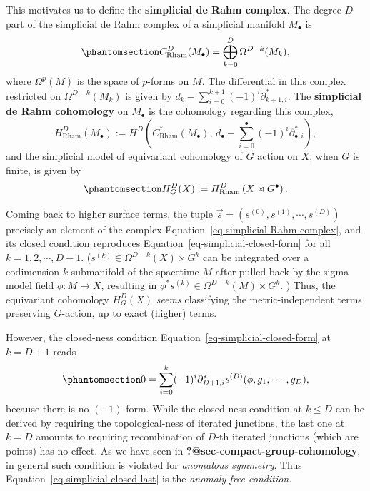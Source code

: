 \documentclass[11pt,toc=bibliography]{scrbook}
\numberwithin{equation}{section}
\begin{document}
This motivates us to define the \textbf{simplicial de Rahm complex}. The
degree \(D\) part of the simplicial de Rahm complex of a simplicial
manifold \(M_\bullet\) is
\begin{equation}\phantomsection\label{eq-simplicial-Rahm-complex}{
C^{D}_\text{Rham}(M_\bullet) = \bigoplus_{k=0}^{D}\Omega^{D-k}(M_k),
}\end{equation} where \(\Omega^p(M)\) is the space of \(p\)-forms on
\(M\). The differential in this complex restricted on
\(\Omega^{D-k}(M_k)\) is given by
\(d_k - \sum_{i=0}^{k+1} (-1)^i \partial_{k+1,i}^*\). The
\textbf{simplicial de Rahm cohomology} on \(M_\bullet\) is the
cohomology regarding this complex, \[
H_\text{Rham}^D(M_\bullet) := H^D\left(C^*_\text{Rham}(M_\bullet) ,\, d_\bullet - \sum_{i=0}^\bullet (-1)^i \partial_{\bullet,i}^*\right),
\] and the simplicial model of equivariant cohomology of \(G\) action on
\(X\), when \(G\) is finite, is given by
\begin{equation}\phantomsection\label{eq-equivariant-borel}{
H_G^D(X) := H_\text{Rham}^D\left(X\rtimes G^\bullet\right).
}\end{equation}

Coming back to higher surface terms, the tuple
\(\vec{s} = (s^{(0)},s^{(1)},\cdots, s^{(D)})\) precisely an element of
the complex Equation~\ref{eq-simplicial-Rahm-complex}, and its closed
condition reproduces Equation~\ref{eq-simplicial-closed-form} for all
\(k=1,2,\cdots, D-1\). (\(s^{(k)} \in \Omega^{D-k}(X)\times G^k\) can be
integrated over a codimension-\(k\) submanifold of the spacetime \(M\)
after pulled back by the sigma model field \(\phi : M \to X\), resulting
in \(\phi^* s^{(k)} \in  \Omega^{D-k}(M)\times G^k\). ) Thus, the
equivariant cohomology \(H_G^D(X)\) \emph{seems} classifying the
metric-independent terms preserving \(G\)-action, up to exact (higher)
terms.

However, the closed-ness condition
Equation~\ref{eq-simplicial-closed-form} at \(k=D+1\) reads
\begin{equation}\phantomsection\label{eq-simplicial-closed-last}{
0 = \sum_{i=0}^{k} (-1)^{i} \partial_{D+1,i}^* s^{(D)}(\phi,g_1,\cdots,g_D),
}\end{equation} because there is no \((-1)\)-form. While the closed-ness
condition at \(k \le D\) can be derived by requiring the
topological-ness of iterated junctions, the last one at \(k=D\) amounts
to requiring recombination of \(D\)-th iterated junctions (which are
points) has no effect. As we have seen in
\textbf{?@sec-compact-group-cohomology}, in general such condition is
violated for \emph{anomalous symmetry}. Thus
Equation~\ref{eq-simplicial-closed-last} is the \emph{anomaly-free
condition}.
\end{document}
